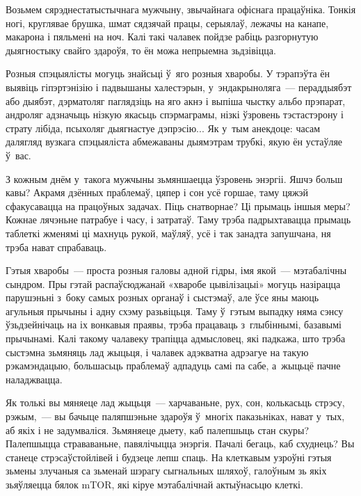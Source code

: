Возьмем сярэднестатыстычнага мужчыну, звычайнага офіснага працаўніка. Тонкія ногі, круглявае брушка, шмат сядзячай працы, серыялаў, лежачы на канапе, макарона і пяльмені на ноч. Калі такі чалавек пойдзе рабіць разгорнутую дыягностыку свайго здароўя, то ён можа непрыемна зьдзівіцца.

Розныя спэцыялісты могуць знайсьці ў~яго розныя хваробы. У тэрапэўта ён выявіць гіпэртэнізію і падвышаны халестэрын, у~эндакрыноляга~--- пераддыябэт або дыябэт, дэрматоляг паглядзіць на яго акнэ і выпіша чыстку альбо прэпарат, андроляг адзначыць нізкую якасьць спэрмаграмы, нізкі ўзровень тэстастэрону і страту лібіда, псыхоляг дыягнастуе дэпрэсію... Як у~тым анекдоце: часам далягляд вузкага спэцыяліста абмежаваны дыямэтрам трубкі, якую ён устаўляе ў~вас.

З кожным днём у~такога мужчыны зьмяншаецца ўзровень энэргіі. Яшчэ больш кавы? Акрамя дзённых праблемаў, цяпер і сон усё горшае, таму цяжэй сфакусавацца на працоўных задачах. Піць снатворнае? Ці прымаць іншыя меры? Кожнае лячэньне патрабуе і часу, і затратаў. Таму трэба падрыхтавацца прымаць таблеткі жменямі ці махнуць рукой, маўляў, усё і так занадта запушчана, ня трэба нават спрабаваць.

Гэтыя хваробы~--- проста розныя галовы адной гідры, імя якой~--- мэтабалічны сындром. Пры гэтай распаўсюджанай «хваробе цывілізацыі» могуць назірацца парушэньні з~боку самых розных органаў і сыстэмаў, але ўсе яны маюць агульныя прычыны і адну схэму разьвіцьця. Таму ў~гэтым выпадку няма сэнсу ўзьдзейнічаць на іх вонкавыя праявы, трэба працаваць з~глыбіннымі, базавымі прычынамі. Калі такому чалавеку трапіцца адмысловец, які падкажа, што трэба сыстэмна зьмяняць лад жыцьця, і чалавек адэкватна адрэагуе на такую рэкамэндацыю, большасьць праблемаў адпадуць самі па сабе, а~жыцьцё пачне наладжвацца.


Як толькі вы мяняеце лад жыцьця~--- харчаваньне, рух, сон, колькасьць стрэсу, рэжым,~--- вы бачыце паляпшэньне здароўя ў~многіх паказьніках, нават у~тых, аб якіх і не задумваліся. Зьмяняеце дыету, каб палепшыць стан скуры? Палепшыцца страваваньне, павялічыцца энэргія. Пачалі бегаць, каб схуднець? Вы станеце стрэсаўстойлівей і будзеце лепш спаць. На клеткавым узроўні гэтыя зьмены злучаныя са зьменай шэрагу сыгнальных шляхоў, галоўным зь якіх зьяўляецца бялок mTOR, які кіруе мэтабалічнай актыўнасьцю клеткі.

